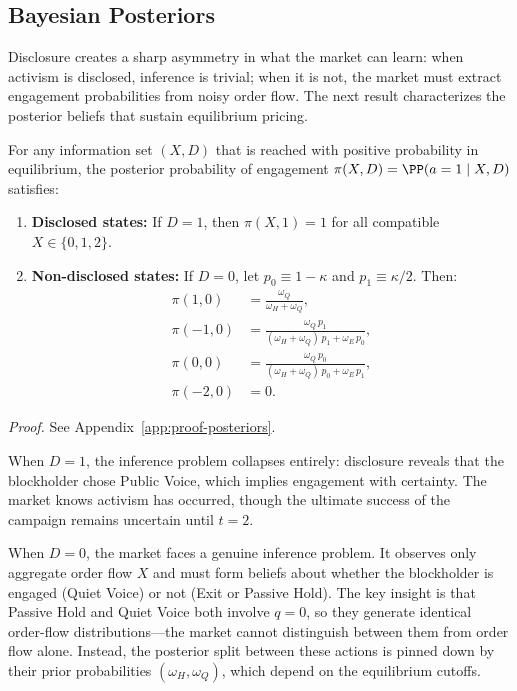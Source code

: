 \subsection{Bayesian Posteriors}

Disclosure creates a sharp asymmetry in what the market can learn: when activism is disclosed, inference is trivial; when it is not, the market must extract engagement probabilities from noisy order flow. The next result characterizes the posterior beliefs that sustain equilibrium pricing.

\begin{proposition}
\label{prop:posteriors}
For any information set $(X,D)$ that is reached with positive probability in equilibrium, the posterior probability of engagement $\pi(X,D) = \PP(a=1 \mid X, D)$ satisfies:
\begin{enumerate}[label=(\alph*)]
\item \textbf{Disclosed states:} If $D = 1$, then $\pi(X, 1) = 1$ for all compatible $X \in \{0, 1, 2\}$.
\item \textbf{Non-disclosed states:} If $D = 0$, let $p_0 \equiv 1 - \kappa$ and $p_1 \equiv \kappa/2$. Then:
\begin{align*}
\pi(1, 0) &= \frac{\omega_Q}{\omega_H + \omega_Q}, \\
\pi(-1, 0) &= \frac{\omega_Q \, p_1}{(\omega_H + \omega_Q) \, p_1 + \omega_E \, p_0}, \\
\pi(0, 0) &= \frac{\omega_Q \, p_0}{(\omega_H + \omega_Q) \, p_0 + \omega_E \, p_1}, \\
\pi(-2, 0) &= 0.
\end{align*}
\end{enumerate}
\end{proposition}
\textit{Proof.} See Appendix~\ref{app:proof-posteriors}.

When $D=1$, the inference problem collapses entirely: disclosure reveals that the blockholder chose Public Voice, which implies engagement with certainty. The market knows activism has occurred, though the ultimate success of the campaign remains uncertain until $t=2$.

When $D=0$, the market faces a genuine inference problem. It observes only aggregate order flow $X$ and must form beliefs about whether the blockholder is engaged (Quiet Voice) or not (Exit or Passive Hold). The key insight is that Passive Hold and Quiet Voice both involve $q=0$, so they generate identical order-flow distributions---the market cannot distinguish between them from order flow alone. Instead, the posterior split between these actions is pinned down by their prior probabilities $(\omega_H,\omega_Q)$, which depend on the equilibrium cutoffs.

